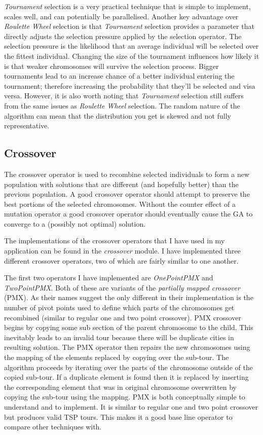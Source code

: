 \documentclass[journal]{IEEEtran}
\begin{document}
\textit{Tournament} selection is a very practical technique that is simple to implement, scales well, and can potentially be parallelised. Another key advantage over \textit{Roulette Wheel} selection is that \textit{Tournament} selection provides a parameter that directly adjusts the selection pressure applied by the selection operator. The selection pressure is the likelihood that an average individual will be selected over the fittest individual. Changing the size of the tournament influences how likely it is that weaker chromosomes will survive the selection process. Bigger tournaments lead to an increase chance of a better individual entering the tournament; therefore increasing the probability that they'll be selected and visa versa. However, it is also worth noting that \textit{Tournament} selection still suffers from the same issues as \textit{Roulette Wheel} selection. The random nature of the algorithm can mean that the distribution you get is skewed and not fully representative.

\subsection{Crossover}
The crossover operator is used to recombine selected individuals to form a new population with solutions that are different (and hopefully better) than the previous population. A good crossover operator should attempt to preserve the best portions of the selected chromosomes. Without the counter effect of a mutation operator a good crossover operator should eventually cause the GA to converge to a (possibly not optimal) solution.

The implementations of the crossover operators that I have used in my application can be found in the \textit{crossover} module. I have implemented three different crossover operators, two of which are fairly similar to one another.

The first two operators I have implemented are \textit{OnePointPMX} and \textit{TwoPointPMX}. Both of these are variants of the \textit{partially mapped crossover} (PMX). As their names suggest the only different in their implementation is the number of pivot points used to define which parts of the chromosomes get recombined (similar to regular one and two point crossover). PMX crossover begins by copying some sub section of the parent chromosome to the child. This inevitably leads to an invalid tour because there will be duplicate cities in resulting solution. The PMX operator then repairs the new chromosomes using the mapping of the elements replaced by copying over the sub-tour. The algorithm proceeds by iterating over the parts of the chromosome outside of the copied sub-tour. If a duplicate element is found then it is replaced by inserting the corresponding element that was in original chromosome overwritten by copying the sub-tour using the mapping. PMX is both conceptually simple to understand and to implement. It is similar to regular one and two point crossover but produces valid TSP tours. This makes it a good base line operator to compare other techniques with.
\end{document}
